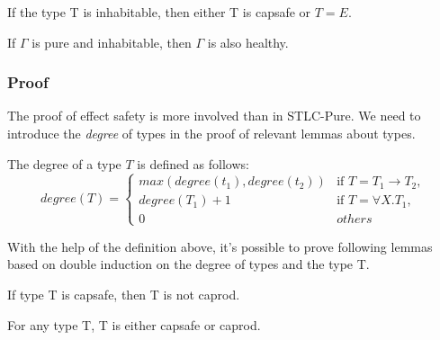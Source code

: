\begin{theorem}
  If the type T is inhabitable, then either T is capsafe or $T = E$.
\end{theorem}

\begin{theorem}
  If $\Gamma$ is pure and inhabitable, then $\Gamma$ is also healthy.
\end{theorem}


\subsubsection{Proof}

The proof of effect safety is more involved than in STLC-Pure. We need
to introduce the \emph{degree} of types in the proof of
relevant lemmas about types.

\begin{definition}
  The degree of a type $T$ is defined as follows:
  \begin{equation*}
    degree(T) =
    \begin{cases}
      max(degree(t_1), degree(t_2)) & \text{if } T = T_1 \to T_2,\\
      degree(T_1) + 1 & \text{if } T = \forall X.T_1,\\
      0 & others
    \end{cases}
  \end{equation*}
\end{definition}

With the help of the definition above, it's possible to prove
following lemmas based on double induction on the degree of types and
the type T.

\begin{lemma}
 If type T is capsafe, then T is not caprod.
\end{lemma}

\begin{lemma}
 For any type T, T is either capsafe or caprod.
\end{lemma}


